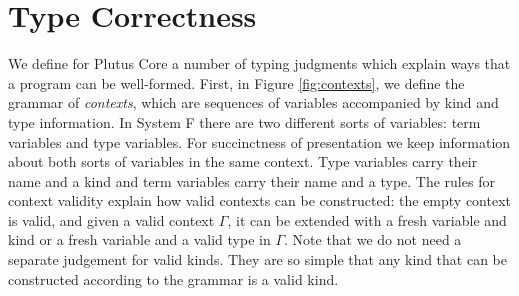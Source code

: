 \documentclass[a4paper]{article}
\begin{document}
\section{Type Correctness}

We define for Plutus Core a number of typing judgments which explain
ways that a program can be well-formed. First, in Figure
\ref{fig:contexts}, we define the grammar of \textit{contexts},
which are sequences of variables accompanied by kind and type
information. In System F there are two different sorts of variables:
term variables and type variables. For succinctness of presentation we
keep information about both sorts of variables in the same
context. Type variables carry their name and a kind and term variables
carry their name and a type. The rules for context validity explain
how valid contexts can be constructed: the empty context is valid, and
given a valid context $\Gamma$, it can be extended with a fresh
variable and kind or a fresh variable and a valid type in
$\Gamma$. Note that we do not need a separate judgement for valid
kinds. They are so simple that any kind that can be constructed
according to the grammar is a valid kind.


\end{document}
